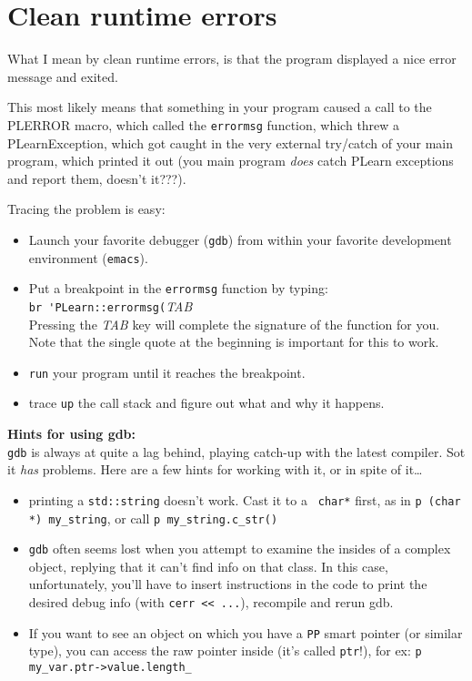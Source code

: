 \documentclass[11pt]{book}
\begin{document}
\section{Clean runtime errors}

What I mean by clean runtime errors, is that the program displayed a nice
error message and exited.

This most likely means that something in your program caused a call to the
PLERROR macro, which called the {\tt errormsg} function, which threw a
PLearnException, which got caught in the very external try/catch of your
main program, which printed it out (you main program {\em does} catch
PLearn exceptions and report them, doesn't it???).

Tracing the problem is easy:
\begin{itemize}

\item Launch your favorite debugger ({\tt gdb}) from within your
favorite development environment ({\tt emacs}).

\item Put a breakpoint in the {\tt errormsg} function by typing: \\
\verb!br 'PLearn::errormsg(!{\it TAB} \\
Pressing the {\it TAB} key will complete the signature of the function
for you. Note that the single quote at the beginning is important for
this to work.

\item {\tt run} your program until it reaches the breakpoint.

\item trace {\tt up} the call stack and figure out what and why it
happens.

\end{itemize}

{\bf Hints for using gdb:} \\
{\tt gdb} is always at quite a lag behind, playing catch-up with the
latest compiler. Sot it {\em has} problems.  Here are a few hints for
working with it, or in spite of it\ldots
\begin{itemize}

\item printing a {\tt std::string} doesn't work. Cast it to a {\tt
  char*} first, as in \verb!p (char *) my_string!, or call
  \verb!p my_string.c_str()!

\item {\tt gdb} often seems lost when you attempt to examine the insides
  of a complex object, replying that it can't find info on that class.  In
  this case, unfortunately, you'll have to insert instructions in the code
  to print the desired debug info (with \verb!cerr << ...!), recompile and
  rerun gdb.

\item If you want to see an object on which you have a {\tt PP} smart
  pointer (or similar type), you can access the raw pointer inside (it's
  called {\tt ptr}!), for ex: \verb!p my_var.ptr->value.length_!
\end{itemize}
\end{document}
